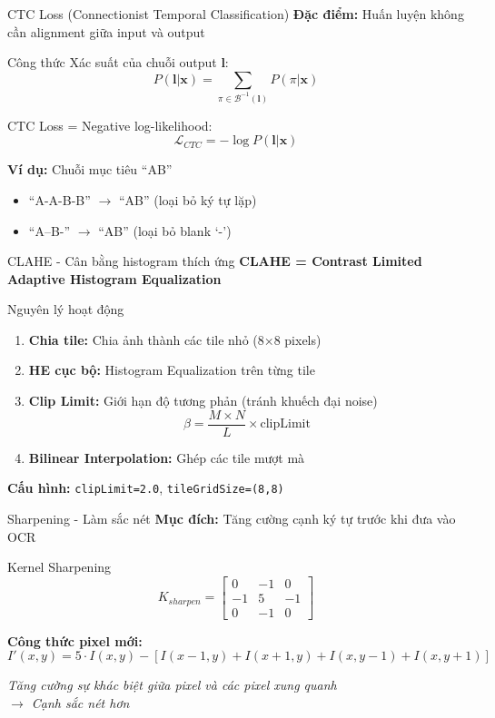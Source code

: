 \begin{frame}{CTC Loss (Connectionist Temporal Classification)}
    \textbf{Đặc điểm:} Huấn luyện không cần alignment giữa input và output

    \begin{block}{Công thức}
    Xác suất của chuỗi output $\mathbf{l}$:
    $$ P(\mathbf{l} | \mathbf{x}) = \sum_{\pi \in \mathcal{B}^{-1}(\mathbf{l})} P(\pi | \mathbf{x}) $$

    CTC Loss = Negative log-likelihood:
    $$ \mathcal{L}_{CTC} = -\log P(\mathbf{l} | \mathbf{x}) $$
    \end{block}

    \textbf{Ví dụ:} Chuỗi mục tiêu ``AB''
    \begin{itemize}
        \item ``A-A-B-B'' $\rightarrow$ ``AB'' (loại bỏ ký tự lặp)
        \item ``A--B-'' $\rightarrow$ ``AB'' (loại bỏ blank `-')
    \end{itemize}
\end{frame}

\begin{frame}{CLAHE - Cân bằng histogram thích ứng}
    \textbf{CLAHE = Contrast Limited Adaptive Histogram Equalization}

    \begin{block}{Nguyên lý hoạt động}
    \begin{enumerate}
        \item \textbf{Chia tile:} Chia ảnh thành các tile nhỏ (8×8 pixels)
        \item \textbf{HE cục bộ:} Histogram Equalization trên từng tile
        \item \textbf{Clip Limit:} Giới hạn độ tương phản (tránh khuếch đại noise)
        $$ \beta = \frac{M \times N}{L} \times \text{clipLimit} $$
        \item \textbf{Bilinear Interpolation:} Ghép các tile mượt mà
    \end{enumerate}
    \end{block}

    \textbf{Cấu hình:} \texttt{clipLimit=2.0}, \texttt{tileGridSize=(8,8)}
\end{frame}

\begin{frame}{Sharpening - Làm sắc nét}
    \textbf{Mục đích:} Tăng cường cạnh ký tự trước khi đưa vào OCR

    \begin{block}{Kernel Sharpening}
    $$ K_{sharpen} = \begin{bmatrix} 0 & -1 & 0 \\ -1 & 5 & -1 \\ 0 & -1 & 0 \end{bmatrix} $$
    \end{block}

    \textbf{Công thức pixel mới:}
    $$ I'(x,y) = 5 \cdot I(x,y) - [I(x-1,y) + I(x+1,y) + I(x,y-1) + I(x,y+1)] $$

    \textit{Tăng cường sự khác biệt giữa pixel và các pixel xung quanh \\  $\rightarrow$ Cạnh sắc nét hơn}
\end{frame}

